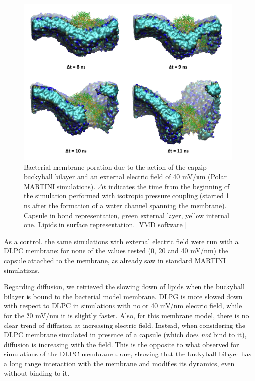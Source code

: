 \begin{figure}[t!]
\centering\includegraphics[width=0.95\linewidth]{3results_capsule/pics/poration_martini.png} 
\caption[Bacterial membrane poration (MARTINI simulations)]{Bacterial membrane poration due to the action of the capzip buckyball bilayer and an external electric field of 40 mV/nm (Polar MARTINI simulations). $\Delta t$ indicates the time from the beginning of the simulation performed with isotropic pressure coupling (started 1 ns after the formation of a water channel spanning the membrane). Capsule in bond representation, green external layer, yellow internal one. Lipids in surface representation. [VMD software \citet{HUMP96}]}
\label{fig:martini_poration}
\end{figure}

As a control, the same simulations with external electric field were run with a DLPC membrane: for none of the values tested (0, 20 and 40 mV/nm) the capsule attached to the membrane, as already saw in standard MARTINI simulations.
%

Regarding diffusion, we retrieved the slowing down of lipids when the buckyball bilayer is bound to the bacterial model membrane. DLPG is more slowed down with respect to DLPC in simulations with no or 40 mV/nm electric field, while for the 20 mV/nm it is slightly faster. Also, for this membrane model, there is no clear trend of diffusion at increasing electric field.
%
Instead, when considering the DLPC membrane simulated in presence of a capsule (which does \emph{not} bind to it), diffusion is increasing with the field. This is the opposite to what observed for simulations of the DLPC membrane alone, showing that the buckyball bilayer has a long range interaction with the membrane and modifies its dynamics, even without binding to it. 

